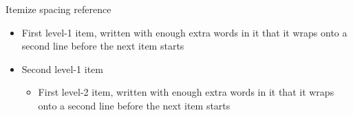 \begin{standardframe}{Itemize spacing reference}
	\vspace*{-13pt}
	\begin{itemize}
		\item First level-1 item, written with enough extra words in it that it wraps onto a second line before the next item starts
		\item Second level-1 item
		\begin{itemize}
			\item First level-2 item, written with enough extra words in it that it wraps onto a second line before the next item starts

\end{itemize}
\end{itemize}
\end{standardframe}
